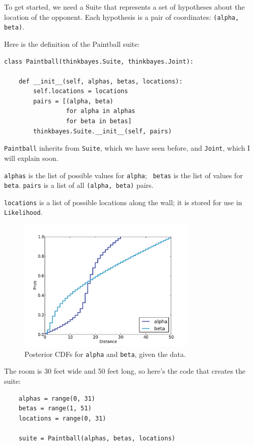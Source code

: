 \documentclass[12pt]{book}
\begin{document}
To get started, we need a Suite that represents a set of hypotheses
about the location of the opponent.  Each hypothesis is a
pair of coordinates: {\tt (alpha, beta)}.

Here is the definition of the Paintball suite:

\begin{verbatim}
class Paintball(thinkbayes.Suite, thinkbayes.Joint):

    def __init__(self, alphas, betas, locations):
        self.locations = locations
        pairs = [(alpha, beta) 
                 for alpha in alphas 
                 for beta in betas]
        thinkbayes.Suite.__init__(self, pairs)
\end{verbatim}

{\tt Paintball} inherits from {\tt Suite}, which we have seen before,
and {\tt Joint}, which I will explain soon.

{\tt alphas} is the list of possible values for {\tt alpha}; {\tt
  betas} is the list of values for {\tt beta}.  {\tt pairs} is a list
of all {\tt (alpha, beta)} pairs.

{\tt locations} is a list of possible locations along
the wall; it is stored for use in {\tt Likelihood}.

\begin{figure}
\centerline{\includegraphics[height=2.5in]{figs/paintball2.pdf}}
\caption{Posterior CDFs for {\tt alpha} and {\tt beta}, given the data.}
\label{fig.paintball2}
\end{figure}

The room is 30 feet wide and 50 feet long, so here's the code that
creates the suite:

\begin{verbatim}
    alphas = range(0, 31)
    betas = range(1, 51)
    locations = range(0, 31)

    suite = Paintball(alphas, betas, locations)
\end{verbatim}
\end{document}
